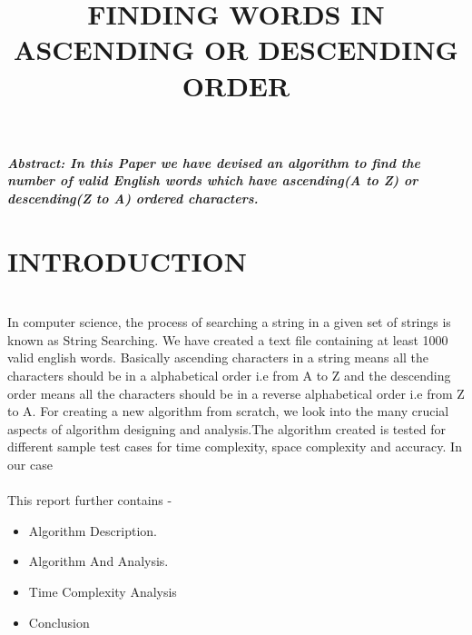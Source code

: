 \documentclass[conference]{IEEEtran}
\begin{document}
\title{FINDING WORDS IN ASCENDING OR DESCENDING ORDER \\
}
\author{
\and
{}
\and
{}
}

\maketitle
{\textbf{\textit{Abstract: In this Paper we have devised an algorithm to find the number of valid English words which have ascending(A to Z) or descending(Z to A) ordered characters.
\\ }}}
\maketitle

\section{INTRODUCTION}\\
In computer science, the process of searching a 
string in a given set of strings is known as 
String Searching. We have created a text file 
containing at least 1000 valid english words. 
Basically ascending characters in a string 
means all the characters should be in a 
alphabetical order i.e from A to Z and the 
descending order means all the characters 
should be in a reverse alphabetical order i.e 
from Z to A. For creating a new algorithm from 
scratch, we look into the many crucial aspects 
of algorithm designing and analysis.The 
algorithm created is tested for different sample 
test cases for time complexity, space 
complexity and accuracy. In our case 
\\\\ This report further contains - 
\begin{itemize}
    \item Algorithm Description.
    \item Algorithm And  Analysis.
    \item Time Complexity Analysis 
    \item Conclusion\\ 
\end{itemize}
\end{document}
